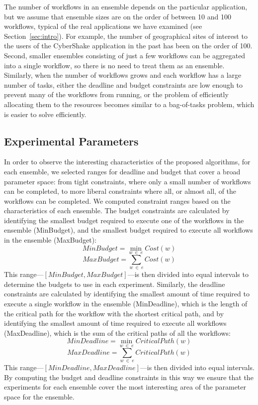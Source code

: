 \documentclass[conference]{IEEEtran}
\begin{document}
The number of workflows in an ensemble depends on the particular application,
but we assume that ensemble sizes are on the order of between 10 and 100
workflows, typical of the real applications we have examined (see Section~\ref{sec:intro}). 
For example, the number of
geographical sites of interest to the users of the CyberShake application in
the past has been on the order of 100. 
Second, smaller ensembles consisting of
just a few workflows can be aggregated into a single workflow, so there is no need to
treat them as an ensemble. Similarly, when the number of workflows grows and
each workflow has a large number of tasks, either the deadline and budget
constraints are low enough to prevent many of the workflows from running, or the
problem of efficiently allocating them to the resources becomes similar to a
bag-of-tasks problem, which is easier to solve efficiently.



\subsection{Experimental Parameters}
\label{sec:exp-parameters}

In order to observe the interesting characteristics of the proposed algorithms,
for each ensemble, we selected ranges for deadline and budget that cover a broad
parameter space: from tight constraints, where only a small number of workflows can be completed,
to more liberal constraints where all, or almost all, of the workflows can be
completed. We computed constraint ranges based on
the characteristics of each ensemble. The budget constraints are calculated by
identifying the smallest budget required to execute one of the workflows in the
ensemble (MinBudget), and the smallest budget required to execute all workflows
in the ensemble (MaxBudget):
%
$$
MinBudget = \min_{w\ \in\ e}{Cost(w)}
$$
$$
MaxBudget = \sum_{w\ \in\ e}{Cost(w)}
$$
%
This range---$[MinBudget, MaxBudget]$---is then divided into equal intervals to
determine the budgets to use in each experiment. Similarly, the deadline
constraints are calculated by identifying the smallest amount
of time required to execute a single workflow in the ensemble (MinDeadline),
which is the length of the critical path for the workflow with the shortest
critical path, and by identifying the smallest amount of time required to
execute all workflows (MaxDeadline), which is the sum of the critical paths of
all the workflows:
%
$$
MinDeadline = \min_{w\ \in\ e}{CriticalPath(w)}
$$
$$
MaxDeadline = \sum_{w\ \in\ e}{CriticalPath(w)}
$$
%
This range---$[MinDeadline, MaxDeadline]$---is then divided into equal intervals. 
By computing the budget and deadline constraints in this way we ensure that the
experiments for each ensemble cover the most interesting area of the parameter space for the
ensemble.
\end{document}
